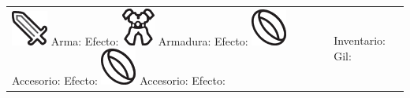 \begin{tabularx}{\columnwidth}{XX}
	\noindent \newline
	\includegraphics[height=0.6\baselineskip]{./art/icons/weapon.png} Arma: \newline 
	\indent Efecto: \newline \newline
	\includegraphics[height=0.6\baselineskip]{./art/icons/armor.png} Armadura: \newline
	\indent Efecto: \newline \newline
	\includegraphics[height=0.6\baselineskip]{./art/icons/acc.png} Accesorio: \newline
	\indent Efecto: \newline \newline
	\includegraphics[height=0.6\baselineskip]{./art/icons/acc.png} Accesorio: \newline
	\indent Efecto: \newline
	&
	\noindent \newline
	\indent Inventario: \hfill Gil: \phantom{9999} \hspace{1cm} \newline \newline
\end{tabularx}

